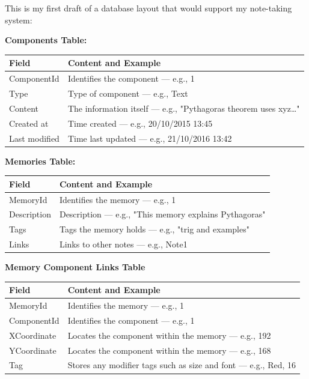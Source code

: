 This is my first draft of a database layout that would support my note-taking system:

\textbf{Components Table:}

\begin{tabularx}{\textwidth}{@{}lX@{}}
    \toprule
    \textbf{Field}         & \textbf{Content and Example} \\
    \midrule
    ComponentId          & Identifies the component — e.g., 1 \\
    Type                  & Type of component — e.g., Text \\
    Content               & The information itself — e.g., "Pythagoras theorem uses xyz…" \\
    Created at            & Time created — e.g., 20/10/2015 13:45 \\
    Last modified         & Time last updated — e.g., 21/10/2016 13:42 \\
    \bottomrule
\end{tabularx}


\textbf{Memories Table:}

\begin{tabularx}{\textwidth}{@{}lX@{}}
    \toprule
    \textbf{Field}     & \textbf{Content and Example} \\
    \midrule
    MemoryId         & Identifies the memory — e.g., 1 \\
    Description        & Description — e.g., "This memory explains Pythagoras" \\
    Tags               & Tags the memory holds — e.g., "trig and examples" \\
    Links              & Links to other notes — e.g., Note1 \\
    \bottomrule
\end{tabularx}

\textbf{Memory Component Links Table}

\begin{tabularx}{\textwidth}{@{}lX@{}}
    \toprule
    \textbf{Field}     & \textbf{Content and Example} \\
    \midrule
    MemoryId         & Identifies the memory — e.g., 1 \\
    ComponentId      & Identifies the component — e.g., 1 \\
    XCoordinate      & Locates the component within the memory — e.g., 192 \\
    YCoordinate      & Locates the component within the memory — e.g., 168 \\
    Tag                & Stores any modifier tags such as size and font — e.g., Red, 16 \\
    \bottomrule
\end{tabularx}

